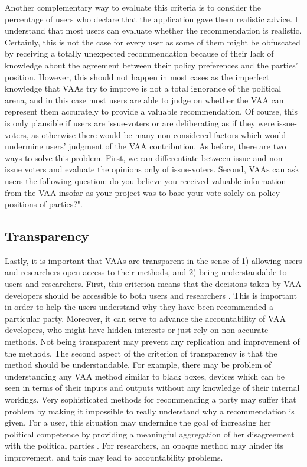 \documentclass{scrartcl}
\begin{document}
Another complementary way to evaluate this criteria is to consider the percentage of users who declare that the application gave them realistic advice. I understand that most users can evaluate whether the recommendation is realistic. Certainly, this is not the case for every user as some of them might be obfuscated by receiving a totally unexpected recommendation because of their lack of knowledge about
the agreement between their policy preferences and the parties' position. However, this
should not happen in most cases as the imperfect knowledge that VAAs try to improve
is not a total ignorance of the political arena, and in this case most users are able to judge on whether the VAA can represent them accurately to provide a valuable recommendation. Of course, this is only plausible if users are issue-voters or are deliberating as if they were issue-voters, as otherwise there would be many non-considered factors which would undermine users' judgment of the VAA contribution. As before, there are two ways to solve this problem. First, we can differentiate between issue and non-issue voters and evaluate the opinions only of issue-voters. Second, VAAs can ask users the following question: do you believe you received valuable information from the VAA insofar as your project was to base your vote solely on policy positions of parties?".  


\subsection{Transparency} 

Lastly, it is important that VAAs are transparent in the sense of 1) allowing users and researchers open access to their methods, and 2) being understandable to users and researchers. First, this criterion means that the decisions taken by VAA developers should be accessible to both users and researchers \cite{gemenis2013estimating}. This is important in order to help the users understand why they have been recommended a particular party. Moreover, it can serve to advance the accountability of VAA developers, who might have hidden interests or just rely on non-accurate methods. Not being transparent may prevent any replication and improvement of the methods. The second aspect of the criterion of transparency is that the method should be understandable. For example, there may be problem of understanding any VAA method similar to black boxes, devices which can be seen in terms of their inputs and outputs without any knowledge of their internal workings. Very sophisticated methods for recommending a party may suffer that problem by making it impossible to really understand why a recommendation is given. For a user, this situation may undermine the goal of increasing her political competence by providing a meaningful aggregation of her disagreement with the political parties \cite{louwerse2014design}. For researchers, an opaque method may hinder its improvement, and this may lead to accountability problems. 
\end{document}
